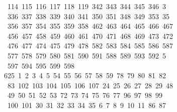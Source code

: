 \begin{tabbing}
\ 114\ 115\ 116\ 117\ 118\ 119\ 342\ 343\ 344\ 345\ 346\ 3\\[0pt]
\ 336\ 337\ 338\ 339\ 340\ 341\ 350\ 351\ 348\ 349\ 353\ 35\\[0pt]
\ 356\ 357\ 354\ 355\ 359\ 358\ 462\ 463\ 464\ 465\ 466\ 467\\[0pt]
\>\ 456\ 457\ 458\ 459\ 460\ 461\ 470\ 471\ 468\ 469\ 473\ 472\\[0pt]
\>\ 476\ 477\ 474\ 475\ 479\ 478\ 582\ 583\ 584\ 585\ 586\ 587\ \\[0pt]
\ 577\ 578\ 579\ 580\ 581\ 590\ 591\ 588\ 589\ 593\ 592\ 5\\[0pt]
\ 597\ 594\ 595\ 599\ 598\ \\[0pt]
625\ 1\ 2\ 3\ 4\ 5\ 54\ 55\ 56\ 57\ 58\ 59\ 78\ 79\ 80\ 81\ 82\\[0pt]
\>\ 83\ 102\ 103\ 104\ 105\ 106\ 107\ 24\ 25\ 26\ 27\ 28\ 29\ 48\\[0pt]
\>\ 49\ 50\ 51\ 52\ 53\ 72\ 73\ 74\ 75\ 76\ 77\ 96\ 97\ 98\ 99\\[0pt]
\>\ 100\ 101\ 30\ 31\ 32\ 33\ 34\ 35\ 6\ 7\ 8\ 9\ 10\ 11\ 86\ 87\\[0pt]

\end{tabbing}
